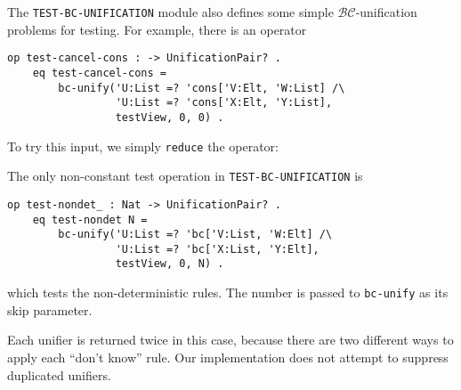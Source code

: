 \documentclass[11pt]{article}
\newcommand{\BC}{\mathcal{BC}}
\begin{document}
The \lstinline|TEST-BC-UNIFICATION| module also defines some simple
$\BC$-unification problems for testing. For example, there is an operator
\begin{lstlisting}[language=Maude, style=smalllisting]
    op test-cancel-cons : -> UnificationPair? .
    eq test-cancel-cons =
        bc-unify('U:List =? 'cons['V:Elt, 'W:List] /\
                 'U:List =? 'cons['X:Elt, 'Y:List],
                 testView, 0, 0) .
\end{lstlisting}
To try this input, we simply \lstinline|reduce| the operator:
\vspace{1ex}


\vspace{1ex}

The only non-constant test operation in \lstinline|TEST-BC-UNIFICATION| is
\begin{lstlisting}[language=Maude, style=smalllisting]
    op test-nondet_ : Nat -> UnificationPair? .
    eq test-nondet N =
        bc-unify('U:List =? 'bc['V:List, 'W:Elt] /\
                 'U:List =? 'bc['X:List, 'Y:Elt],
                 testView, 0, N) .
\end{lstlisting}
which tests the non-deterministic rules. The number is passed to
\lstinline|bc-unify| as its skip parameter.
\vspace{1ex}

Each unifier is returned twice in this case, because there are two different
ways to apply each ``don't know'' rule. Our implementation does not attempt to
suppress duplicated unifiers.
\end{document}
